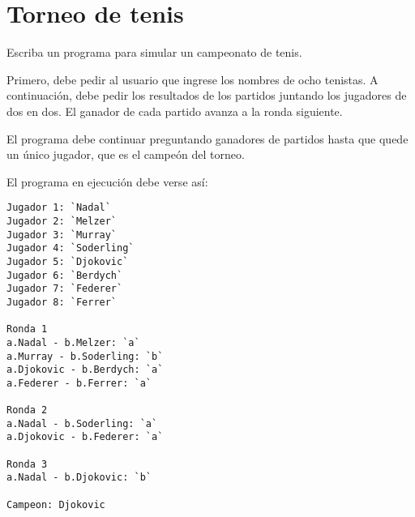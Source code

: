 \section{Torneo de tenis}

Escriba un programa para simular un campeonato de tenis.

Primero, debe pedir al usuario que ingrese los nombres de ocho tenistas.
A continuación, debe pedir los resultados de los partidos juntando los
jugadores de dos en dos. El ganador de cada partido avanza a la ronda
siguiente.

El programa debe continuar preguntando ganadores de partidos hasta que
quede un único jugador, que es el campeón del torneo.

El programa en ejecución debe verse así:
\begin{lstlisting}[language=testcase]
Jugador 1: `Nadal`
Jugador 2: `Melzer`
Jugador 3: `Murray`
Jugador 4: `Soderling`
Jugador 5: `Djokovic`
Jugador 6: `Berdych`
Jugador 7: `Federer`
Jugador 8: `Ferrer`

Ronda 1
a.Nadal - b.Melzer: `a`
a.Murray - b.Soderling: `b`
a.Djokovic - b.Berdych: `a`
a.Federer - b.Ferrer: `a`

Ronda 2
a.Nadal - b.Soderling: `a`
a.Djokovic - b.Federer: `a`

Ronda 3
a.Nadal - b.Djokovic: `b`

Campeon: Djokovic
\end{lstlisting}

